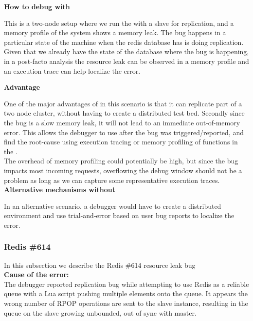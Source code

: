 \noindent \textbf{How to debug with \parikshan}

This is a two-node setup where we run the \productioncontainer with a slave for replication, and a memory profile of the system shows a memory leak. The bug happens in a particular state of the machine when the redis database has is doing replication. Given that we already have the state of the database where the bug is happening, in a post-facto analysis the resource leak can be observed in a memory profile and an execution trace can help localize the error. 

\noindent \textbf{Advantage}

One of the major advantages of \parikshan in this scenario is that it can replicate part of a two node cluster, without having to create a distributed test bed. Secondly since the bug is a slow memory leak, it will not lead to an immediate out-of-memory error. This allows the debugger to use \parikshan after the bug was triggered/reported, and find the root-cause using execution tracing or memory profiling of functions in the \debugcontainer. \\

The overhead of memory profiling could potentially be high, but since the bug impacts most incoming requests, overflowing the debug window should not be a problem as long as we can capture some representative execution traces.\\

\noindent \textbf{Alternative mechanisms without \parikshan}

In an alternative scenario, a debugger would have to create a distributed environment and use trial-and-error based on user bug reports to localize the error.\\

\subsubsection{Redis \#614}

In this subsection we describe the Redis \#614 resource leak bug \\

\noindent \textbf{Cause of the error:} \\

The debugger reported replication bug while attempting to use Redis as a reliable queue with a Lua script pushing multiple elements onto the queue. 
It appears the wrong number of RPOP operations are sent to the slave instance, resulting in the queue on the slave growing unbounded, out of sync with master.\\

